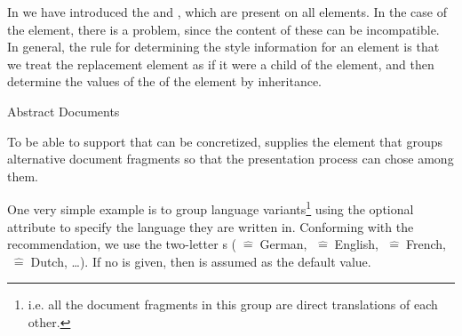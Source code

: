 \begin{omgroup}[id=omdoc-infrastructure,short=Document Infrastructure]
\begin{module}[id=sharing]
\begin{omgroup}[id=sharing,short=Sharing Document Parts]
In  we have introduced the {\css}
  and ,
which are present on all \omdoc elements. In the case of the  element,
there is a problem, since the content of these can be incompatible. In general, the rule
for determining the style information for an element is that we treat the replacement
element as if it were a child of the  element, and then determine the
values of the {\css}  of the  element by
inheritance.
\end{omgroup}
\end{module}

\begin{module}[id=docalt]
\begin{omgroup}{Abstract Documents}

\begin{definition}[id=docalt.def]
  To be able to support {} that can be concretized, \omdoc
  supplies the {} element that groups alternative document fragments so that the
  presentation process can chose among them.
 \end{definition}

\begin{example}
  One very simple example is to group language variants\footnote{i.e. all the document
    fragments in this group are direct translations of each other.} using the optional
  {} attribute to specify the language they are written
  in. Conforming with the {\xml} recommendation, we use the  two-letter {s}
  ({}$\;\widehat=\;$German, {}$\;\widehat=\;$English,
  {}$\;\widehat=\;$French, {}$\;\widehat=\;$Dutch, \ldots). If
  no {} is given, then {} is
  assumed as the default value. 


\end{example}
\end{omgroup}
\end{module}
\end{omgroup}
